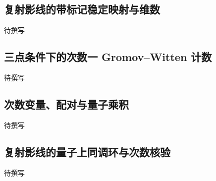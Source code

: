 \subsection{复射影线的带标记稳定映射与维数}
\label{g4:subsec:2803:05}
待撰写

\subsection{三点条件下的次数一 Gromov–Witten 计数}
\label{g4:subsec:2803:06}
待撰写

\subsection{次数变量、配对与量子乘积}
\label{g4:subsec:2803:07}
待撰写

\subsection{复射影线的量子上同调环与次数核验}
\label{g4:subsec:2803:08}
待撰写

